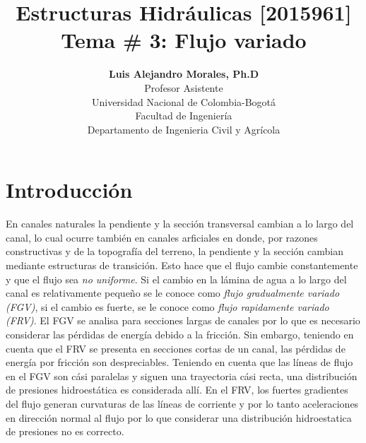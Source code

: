 \documentclass[11pt, oneside]{article}
\title{Estructuras Hidr\'aulicas [2015961] \\ \textbf{Tema \# 3: Flujo variado}}
\author{\textbf{Luis Alejandro Morales, Ph.D}\\ \vspace{0.4cm} Profesor Asistente \\ Universidad Nacional de Colombia-Bogot\'a\\Facultad de Ingenier\'ia \\ Departamento de Ingenieria Civil y Agr\'icola}
\date{}
\begin{document}
\maketitle
\tableofcontents


\section{Introducci\'on} %
En canales naturales la pendiente y la secci\'on transversal cambian a lo largo del canal, lo cual ocurre tambi\'en en canales arficiales en donde, por razones constructivas y de la topograf\'ia del terreno, la pendiente y la secci\'on cambian mediante estructuras de transici\'on.  Esto hace que el flujo cambie constantemente y que el flujo sea \emph{no uniforme}. Si el cambio  en la l\'amina de agua a lo largo del canal es relativamente  pequeño se le conoce como \emph{flujo gradualmente variado (FGV)}, si el cambio es fuerte, se le conoce como \emph{flujo rapidamente variado (FRV)}. El FGV se analisa para secciones largas de canales por lo que es necesario considerar las p\'erdidas de energ\'ia debido a la fricci\'on. Sin embargo, teniendo en cuenta que el  FRV se presenta en secciones cortas de un canal, las p\'erdidas de energ\'ia por fricci\'on son despreciables. Teniendo en cuenta que las l\'ineas de flujo en el FGV son c\'asi paralelas y siguen una trayectoria c\'asi recta, una distribuci\'on de presiones hidroest\'atica es considerada all\'i. En el FRV, los fuertes gradientes del flujo generan curvaturas de las l\'ineas de corriente y por lo tanto aceleraciones en direcci\'on normal al flujo por lo que considerar una distribuci\'on hidroestatica de presiones no es correcto. 
\end{document}
